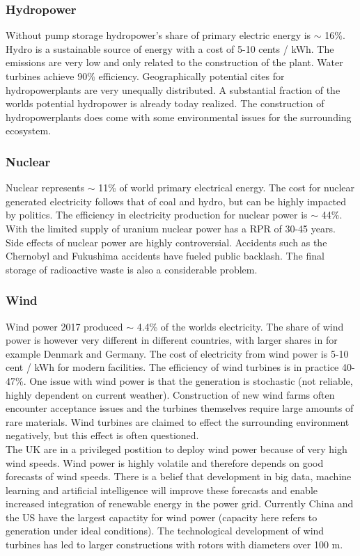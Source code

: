 \subsubsection{Hydropower}
Without pump storage hydropower's share of primary electric energy is $\sim$ 16\%.
Hydro is a sustainable source of energy with a cost of 5-10 cents / kWh.
The emissions are very low and only related to the construction of the plant.
Water turbines achieve 90\% efficiency.
Geographically potential cites for hydropowerplants are very unequally distributed.
A substantial fraction of the worlds potential hydropower is already today realized.
The construction of hydropowerplants does come with some environmental issues for the surrounding ecosystem.

\subsubsection{Nuclear}
Nuclear represents $\sim$ 11\% of world primary electrical energy. The cost for nuclear generated electricity follows that of coal and hydro, but can be highly impacted by politics.
The efficiency in electricity production for nuclear power is $\sim$ 44\%.
With the limited supply of uranium nuclear power has a RPR of 30-45 years.
Side effects of nuclear power are highly controversial. Accidents such as the Chernobyl and Fukushima accidents have fueled public backlash. The final storage of radioactive waste is also a considerable problem.

\subsubsection{Wind}
Wind power 2017 produced $\sim$ 4.4\% of the worlds electricity.
The share of wind power is however very different in different countries, with larger shares in for example Denmark and Germany.
The cost of electricity from wind power is 5-10 cent / kWh for modern facilities.
The efficiency of wind turbines is in practice 40-47\%.
One issue with wind power is that the generation is stochastic (not reliable, highly dependent on current weather).
Construction of new wind farms often encounter acceptance issues and the turbines themselves require large amounts of rare materials.
Wind turbines are claimed to effect the surrounding environment negatively, but this effect is often questioned.\\

The UK are in a privileged postition to deploy wind power because of very high wind speeds.
Wind power is highly volatile and therefore depends on good forecasts of wind speeds.
There is a belief that development in big data, machine learning and artificial intelligence will improve these forecasts and enable increased integration of renewable energy in the power grid.
Currently China and the US have the largest capactity for wind power (capacity here refers to generation under ideal conditions).
The technological development of wind turbines has led to larger constructions with rotors with diameters over 100 m.

